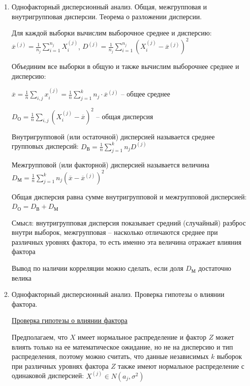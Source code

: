 \begin{enumerate}
    \Nota Для работы критерия необходимо, что бы частота в каждой клетке была больше 5, а объем выборки был достаточно большой

    \item Однофакторный дисперсионный анализ. Общая, межгрупповая и внутригрупповая дисперсии. Теорема о разложении дисперсии.

    Для каждой выборки вычислим выборочное среднее и дисперсию: $\overline{x}^{(j)} = \frac{1}{n_j} \sum_{i = 1}^{n_j} X_i^{(j)}$, 
    $D^{(j)} = \frac{1}{n_j} \sum_{i = 1}^{n_j} (X_i^{(j)} - \overline{x}^{(j)})^2$

    Объединим все выборки в общую и также вычислим выборочнее среднее и дисперсию: 

    $\overline{x} = \frac{1}{n} \sum_{i, j} x^{(j)}_i = \frac{1}{n} \sum_{j = 1}^k n_j \cdot \overline{x}^{(j)}$ -- общее среднее

    $D_\text{О} = \frac{1}{n} \sum_{i, j} (X^{(j)}_i - \overline{x})^2$ -- общая дисперсия

    \Def Внутригрупповой (или остаточной) дисперсией называется среднее групповых дисперсий: $D_{\text{В}} = \frac{1}{n} \sum_{j = 1}^k n_j D^{(j)}$

    \Def Межгрупповой (или факторной) дисперсией называется величина $D_{\text{М}} = \frac{1}{n} \sum_{j = 1}^k n_j (\overline{x} - \overline{x}^{(j)})^2$

    \begin{MyTheorem}
         Общая дисперсия равна сумме внутригрупповой и межгрупповой дисперсией: $D_\text{О} = D_\text{В} + D_\text{М}$
    \end{MyTheorem}

    Смысл: внутригрупповая дисперсия показывает средний (случайный) разброс внутри выборок, межгрупповая -- насколько отличаются среднее при различных 
    уровнях фактора, то есть именно эта величина отражает влияния фактора

    Вывод по наличии корреляции можно сделать, если доля $D_\text{М}$ достаточно велика

    \item Однофакторный дисперсионный анализ. Проверка гипотезы о влиянии фактора.

    \hyperlink{factor_influence_hypothesis}{Проверка гипотезы о влиянии фактора}
    
    Предполагаем, что $X$ имеет нормальное распределение и фактор $Z$ может влиять только на ее математическое ожидание, 
    но не на дисперсию и тип распределения, поэтому можно считать, что данные независимых $k$ выборок при различных уровнях фактора $Z$
    также имеют нормальное распределение с одинаковой дисперсией: $X^{(j)} \in N(a_j, \sigma^2)$


\end{enumerate}
